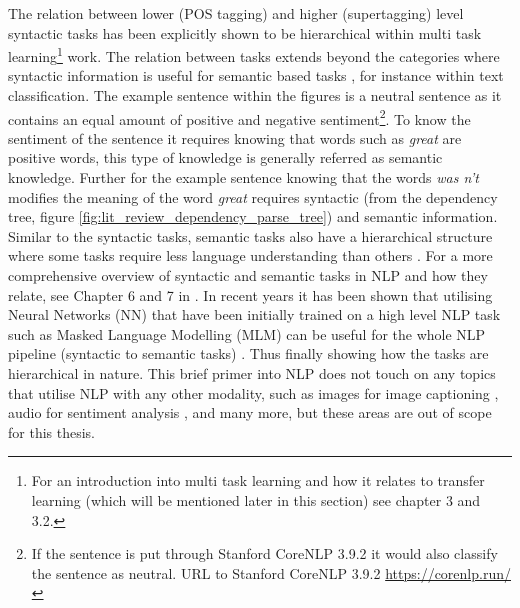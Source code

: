The relation between lower (POS tagging) and higher (supertagging) level syntactic tasks has been explicitly shown to be hierarchical within \citet{sogaard-goldberg-2016-deep} multi task learning\footnote{For an introduction into multi task learning and how it relates to transfer learning (which will be mentioned later in this section) see \citep{ruder2019neural} chapter 3 and 3.2.} work. The relation between tasks extends beyond the categories where syntactic information is useful for semantic based tasks \citep{hashimoto-etal-2017-joint}, for instance within text classification. The example sentence within the figures is a neutral sentence as it contains an equal amount of positive and negative sentiment\footnote{If the sentence is put through Stanford CoreNLP 3.9.2 it would also classify the sentence as neutral. URL to Stanford CoreNLP 3.9.2 \url{https://corenlp.run/}}. To know the sentiment of the sentence it requires knowing that words such as \textit{great} are positive words, this type of knowledge is generally referred as semantic knowledge. Further for the example sentence knowing that the words \textit{was n't} modifies the meaning of the word \textit{great} requires syntactic (from the dependency tree, figure \ref{fig:lit_review_dependency_parse_tree}) and semantic information. Similar to the syntactic tasks, semantic tasks also have a hierarchical structure where some tasks require less language understanding than others \citep{sanh2019hierarchical}. For a more comprehensive overview of syntactic and semantic tasks in NLP and how they relate, see Chapter 6 and 7 in \citet{goldberg2017neural}. In recent years it has been shown that utilising Neural Networks (NN) that have been initially trained on a high level NLP task such as Masked Language Modelling (MLM) \citep{devlin-etal-2019-bert} can be useful for the whole NLP pipeline (syntactic to semantic tasks) \citep{tenney-etal-2019-bert}. Thus finally showing how the tasks are hierarchical in nature. This brief primer into NLP does not touch on any topics that utilise NLP with any other modality, such as images for image captioning \citep{Karpathy_2015_CVPR}, audio for sentiment analysis \citep{raaijmakers-etal-2008-multimodal}, and many more, but these areas are out of scope for this thesis.

